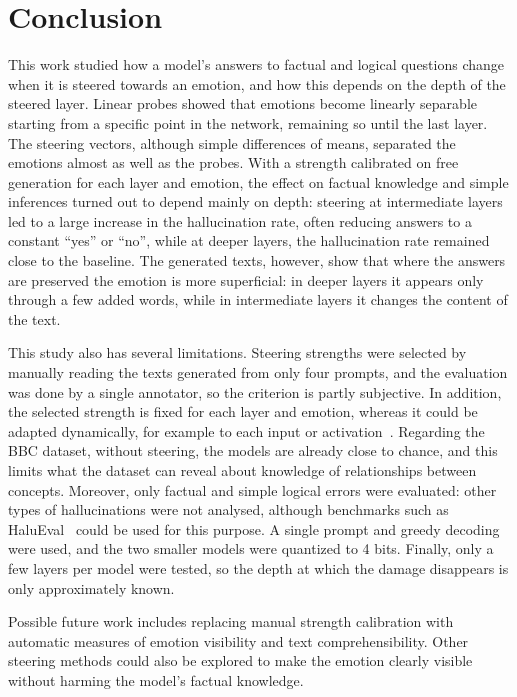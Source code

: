 \documentclass{article}
\begin{document}
\section{Conclusion}
This work studied how a model's answers to factual and logical questions change when it is steered towards an emotion, and how this depends on the depth of the steered layer. Linear probes showed that emotions become linearly separable starting from a specific point in the network, remaining so until the last layer. The steering vectors, although simple differences of means, separated the emotions almost as well as the probes. With a strength calibrated on free generation for each layer and emotion, the effect on factual knowledge and simple inferences turned out to depend mainly on depth: steering at intermediate layers led to a large increase in the hallucination rate, often reducing answers to a constant ``yes'' or ``no'', while at deeper layers, the hallucination rate remained close to the baseline. The generated texts, however, show that where the answers are preserved the emotion is more superficial: in deeper layers it appears only through a few added words, while in intermediate layers it changes the content of the text.

This study also has several limitations. Steering strengths were selected by manually reading the texts generated from only four prompts, and the evaluation was done by a single annotator, so the criterion is partly subjective. In addition, the selected strength is fixed for each layer and emotion, whereas it could be adapted dynamically, for example to each input or activation~\cite{wang2024act}. Regarding the BBC dataset, without steering, the models are already close to chance, and this limits what the dataset can reveal about knowledge of relationships between concepts. Moreover, only factual and simple logical errors were evaluated: other types of hallucinations were not analysed, although benchmarks such as HaluEval~\cite{li2023halueval} could be used for this purpose. A single prompt and greedy decoding were used, and the two smaller models were quantized to 4 bits. Finally, only a few layers per model were tested, so the depth at which the damage disappears is only approximately known.

Possible future work includes replacing manual strength calibration with automatic measures of emotion visibility and text comprehensibility. Other steering methods could also be explored to make the emotion clearly visible without harming the model's factual knowledge.
  

\end{document}
